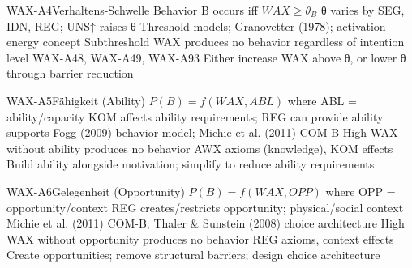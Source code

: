 \begin{axiomspec}{WAX-A4}{Verhaltens-Schwelle}
 Behavior B occurs iff $WAX \geq \theta_B$
 θ varies by SEG, IDN, REG; UNS↑ raises θ
 Threshold models; Granovetter (1978); activation energy concept
 Subthreshold WAX produces no behavior regardless of intention level
 WAX-A48, WAX-A49, WAX-A93
 Either increase WAX above θ, or lower θ through barrier reduction
\end{axiomspec}


\begin{axiomspec}{WAX-A5}{Fähigkeit (Ability)}
 $P(B) = f(WAX, ABL)$ where ABL = ability/capacity
 KOM affects ability requirements; REG can provide ability supports
 Fogg (2009) behavior model; Michie et al. (2011) COM-B
 High WAX without ability produces no behavior
 AWX axioms (knowledge), KOM effects
 Build ability alongside motivation; simplify to reduce ability requirements
\end{axiomspec}


\begin{axiomspec}{WAX-A6}{Gelegenheit (Opportunity)}
 $P(B) = f(WAX, OPP)$ where OPP = opportunity/context
 REG creates/restricts opportunity; physical/social context
 Michie et al. (2011) COM-B; Thaler \& Sunstein (2008) choice architecture
 High WAX without opportunity produces no behavior
 REG axioms, context effects
 Create opportunities; remove structural barriers; design choice architecture
\end{axiomspec}


